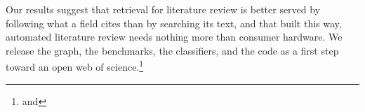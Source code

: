 Our results suggest that retrieval for literature review is better served by following what a field cites than by searching its text, and that built this way, automated literature review needs nothing more than consumer hardware. We release the graph, the benchmarks, the classifiers, and the code as a first step toward an open web of science.\footnote{ and }

